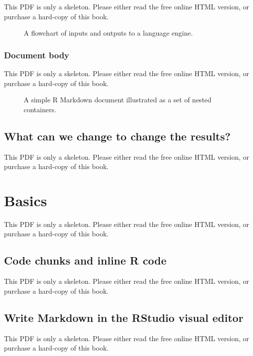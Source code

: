 \documentclass[
  11pt,
]{krantz}
\begin{document}
This PDF is only a skeleton. Please either read the free online HTML version, or purchase a hard-copy of this book.

\begin{figure}\caption{A flowchart of inputs and outputs to a language engine.}\end{figure}

\subsection{Document body}\label{document-body}

This PDF is only a skeleton. Please either read the free online HTML version, or purchase a hard-copy of this book.

\begin{figure}\caption{A simple R Markdown document illustrated as a set of nested containers.}\end{figure}

\section{What can we change to change the results?}\label{what-to-change}

This PDF is only a skeleton. Please either read the free online HTML version, or purchase a hard-copy of this book.

\chapter{Basics}\label{basics}

This PDF is only a skeleton. Please either read the free online HTML version, or purchase a hard-copy of this book.

\section{Code chunks and inline R code}\label{r-code}

This PDF is only a skeleton. Please either read the free online HTML version, or purchase a hard-copy of this book.

\section{Write Markdown in the RStudio visual editor}\label{rstudio-visual}

This PDF is only a skeleton. Please either read the free online HTML version, or purchase a hard-copy of this book.
\end{document}
